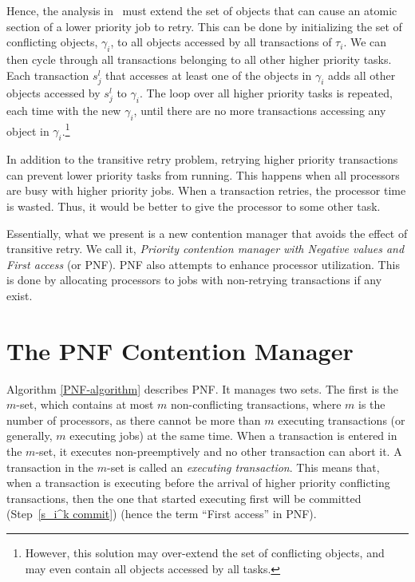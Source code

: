 \documentclass[twocolumn]{article}
\begin{document}
Hence, the analysis in~\cite{stmconcurrencycontrol:emsoft11,lcmdac2012} must extend the set of objects that can cause an atomic section of a lower priority job to retry.  This can be done by initializing the set of conflicting objects, $\gamma_i$, to all objects accessed by all transactions of $\tau_i$. We can then cycle through all transactions belonging to all other higher priority tasks. Each transaction $s_j^l$ that accesses at least one of the objects in $\gamma_i$ adds all other objects accessed by $s_j^l$ to $\gamma_i$. The loop over all higher priority tasks is repeated, each time with the new $\gamma_i$, until there are no more transactions accessing any object in $\gamma_i$.\footnote{However, this solution may over-extend the set of conflicting objects, and may even contain all objects accessed by all tasks.}

In addition to the transitive retry problem, retrying higher priority transactions can prevent lower priority tasks from running. This happens when all processors are busy with higher priority jobs. When a transaction retries, the processor time is wasted. Thus, it would be better to give the processor to some other task.

Essentially, what we present is a new contention manager that avoids the effect of transitive retry. We call it, \textit{Priority contention manager with Negative values and First access} (or PNF). PNF also attempts to enhance processor utilization. This is done by allocating processors to jobs with non-retrying transactions if any exist. 


\section{The PNF Contention Manager\label{PNF}}

Algorithm \ref{PNF-algorithm} describes PNF. It
manages two sets. The first is the $m$-set, which contains at most $m$ non-conflicting
transactions, where $m$ is the number of processors, as
there cannot be more than $m$ executing transactions (or generally,
$m$ executing jobs) at the same time. When a transaction is entered
in the $m$-set, it executes non-preemptively and no other transaction
can abort it. A transaction in the $m$-set is called an \emph{executing
transaction}. 
This means that, when a transaction is executing before
the arrival of higher priority conflicting transactions, then the
one that started executing first will be committed (Step~\ref{s_i^k commit}) (hence the term ``First access'' in PNF).
\end{document}
